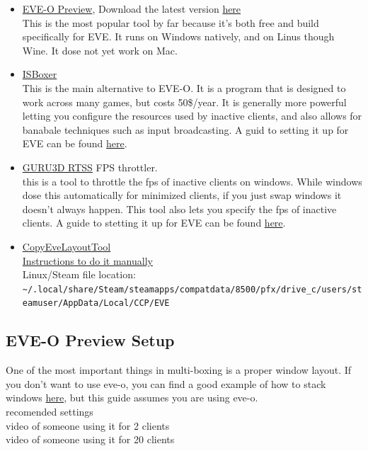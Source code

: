 \documentclass{article}
\begin{document}
\begin{itemize}
  \item \href{https://github.com/Proopai/eve-o-preview}{EVE-O Preview}, Download the latest version \href{https://github.com/Proopai/eve-o-preview/releases}{here} \\
        This is the most popular tool by far because it's both free and build specifically for EVE. It runs on Windows natively, and on Linus
        though Wine. It dose not yet work on Mac.
  \item \href{https://isboxer.com/}{ISBoxer} \\
        This is the main alternative to EVE-O. It is a program that is designed to work across many games, but costs 50\$/year. It
        is generally more powerful letting you configure the resources used by inactive clients, and also allows for banabale techniques
        such as input broadcasting. A guid to setting it up for EVE can be found \href{https://isboxer.com/wiki/EVE:Quick_Start_Guide}{here}.
  \item \href{https://www.guru3d.com/download/rtss-rivatuner-statistics-server-download}{GURU3D RTSS} FPS throttler.\\
        this is a tool to throttle the fps of inactive clients on windows. While windows dose this automatically for minimized clients, if you
        just swap windows it doesn't always happen. This tool also lets you specify the fps of inactive clients. A guide to stetting it up
        for EVE can be found \href{https://www.youtube.com/watch?v=R7YdEPDD_08}{here}.
  \item \href{https://github.com/kshannoninnes/CopyEveLayoutTool}{CopyEveLayoutTool} \\
        \href{https://forums.eveonline.com/t/manually-copy-settings-between-characters-and-accounts/32704}{Instructions to do it manually} \\
        Linux/Steam file location: \lstinline{~/.local/share/Steam/steamapps/compatdata/8500/pfx/drive_c/users/steamuser/AppData/Local/CCP/EVE} \\
\end{itemize}

\clearpage
\subsection{EVE-O Preview Setup}
One of the most important things in multi-boxing is a proper window layout. If you don't want to use eve-o, you can find a good example of how to stack
windows \href{https://www.youtube.com/watch?v=xpiYxq3mpD8}{here}, but this guide assumes you are using eve-o.
\\
recomended settings \\
video of someone using it for 2 clients \\
video of someone using it for 20 clients \\
\end{document}
